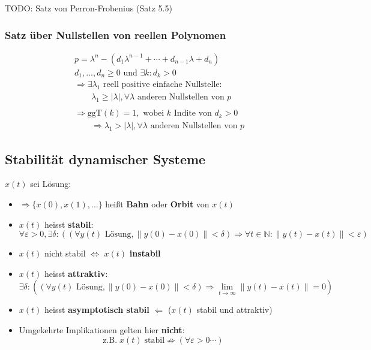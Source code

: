 \documentclass[a4paper]{article}
\begin{document}
TODO: Satz von Perron-Frobenius (Satz 5.5)

\subsubsection{Satz über Nullstellen von reellen Polynomen}
\begin{align*}
	& p = \lambda ^{n} - \left(
		d_1 \lambda ^{n-1} + \cdots + d_{n-1} \lambda + d_n
	\right) \\
	& d_1, ..., d_n \geq 0 \text{ und } 
	\exists k: d_k > 0 \\
	&\Rightarrow \exists \lambda_1 \text{ reell positive einfache Nullstelle}: \\
	& \qquad \lambda_1 \geq | \lambda |, 
	\forall \lambda \text{ anderen Nullstellen von } p \\
	& \\
	&\Rightarrow \text{ggT} ( k ) = 1, \text{ wobei }
	k \text{ Indite von } d_k > 0 \\
	& \qquad \Rightarrow \lambda_1 > | \lambda |, 
	\forall \lambda \text{ anderen Nullstellen von } p
\end{align*}

\subsection{Stabilität dynamischer Systeme}
$x(t)$ sei Lösung:

\begin{itemize}
	\item $\Rightarrow \{
			x(0), x(1), ...
		\} $ heißt \textbf{Bahn} oder \textbf{Orbit} von $x(t)$
	\item $x(t)$ heisst \textbf{stabil}:
		\[
		\forall \varepsilon > 0, \exists \delta :
		\left(
			(
				\forall y(t) \text{ Lösung}, \| y(0) - x(0) \| < \delta
			)
			\Rightarrow \forall t \in \mathbb{N}:
			\| y(t) - x(t) \| < \varepsilon
		\right) 
		\] 
	\item $x(t)$ nicht stabil $\Leftrightarrow$ $x(t)$ \textbf{instabil} 
	\item $x(t)$ heisst \textbf{attraktiv}:
		\[
		\exists \delta : \left(
			(
				\forall y(t) \text{ Lösung}, \| y(0) - x(0) \| < \delta
			)
			\Rightarrow \lim_{t \to \infty} 
			\| y(t) - x(t) \| = 0
		\right) 
		\] 
	\item $x(t)$ heisst \textbf{asymptotisch stabil} 
		$\Leftarrow$ ($x(t)$ stabil und attraktiv)
	\item Umgekehrte Implikationen gelten hier \textbf{nicht}:
		\[
			\text{z.B.} \; x(t) \; \text{stabil} \nRightarrow
			\left(
				\forall \varepsilon > 0 \cdots
			\right) 
		\] 
\end{itemize}
\end{document}
